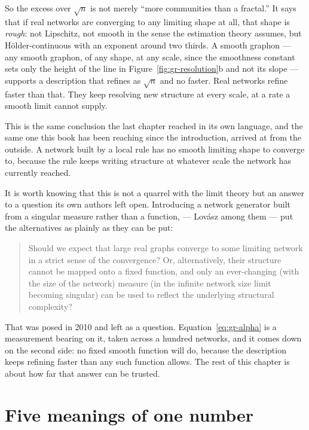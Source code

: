 So the excess over $\sqrt{n}$ is not merely ``more communities than a fractal.''
It says that if real networks are converging to any limiting shape at all, that
shape is \emph{rough}: not Lipschitz, not smooth in the sense the estimation
theory assumes, but H\"older-continuous with an exponent around two thirds. A
smooth graphon --- any smooth graphon, of any shape, at any scale, since the
smoothness constant sets only the height of the line in
Figure~\ref{fig:gr-resolution}b and not its slope --- supports a description that
refines as $\sqrt{n}$ and no faster. Real networks refine faster than that. They
keep resolving new structure at every scale, at a rate a smooth limit cannot
supply.

This is the same conclusion the last chapter reached in its own language, and the
same one this book has been reaching since the introduction, arrived at from the
outside. A network built by a local rule has no smooth limiting shape to converge
to, because the rule keeps writing structure at whatever scale the network has
currently reached.

It is worth knowing that this is not a quarrel with the limit theory but an answer
to a question its own authors left open. Introducing a network generator built from
a singular measure rather than a function, \citet{palla2010} --- Lov\'asz among
them --- put the alternatives as plainly as they can be put:

\begin{quote}\small
Should we expect that large real graphs converge to some limiting network in a
strict sense of the convergence? Or, alternatively, their structure cannot be
mapped onto a fixed function, and only an ever-changing (with the size of the
network) measure (in the infinite network size limit becoming singular) can be used
to reflect the underlying structural complexity?
\end{quote}

\noindent That was posed in 2010 and left as a question. Equation~\eqref{eq:gr-alpha}
is a measurement bearing on it, taken across a hundred networks, and it comes down
on the second side: no fixed smooth function will do, because the description keeps
refining faster than any such function allows. The rest of this chapter is about how
far that answer can be trusted.

\section{Five meanings of one number}
\label{sec:gr-five}


